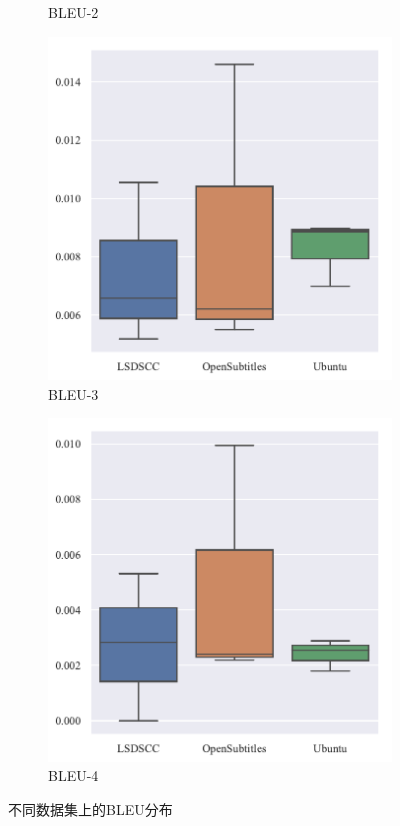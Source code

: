 \begin{figure}[H]
\begin{subfigure}{0.25\linewidth}
        \caption{BLEU-2}
    \end{subfigure}%
    \begin{subfigure}{0.25\linewidth}
        \centering
        \includegraphics[width=\linewidth]{figure/boxplot/dataset/bleu_3/plot.pdf}
        \caption{BLEU-3}
    \end{subfigure}%
    \begin{subfigure}{0.25\linewidth}
        \centering
        \includegraphics[width=\linewidth]{figure/boxplot/dataset/bleu_4/plot.pdf}
        \caption{BLEU-4}
    \end{subfigure}
    \centering
    \caption{不同数据集上的BLEU分布}
    \label{fig:BLEU_dataset}
\end{figure}

